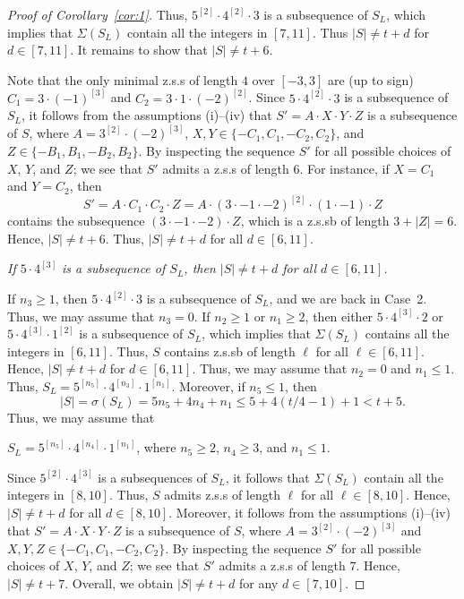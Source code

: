 \documentclass[12 pt]{amsart}
\def \n{\noindent }
\def \bs{\bigskip}
\def \zs{z.s.s }
\def \zsb{z.s.s{\tiny b} }
\begin{document}
\begin{proof}[Proof of Corollary~\ref{cor:1}]
Thus, $5^{[2]}\cdot 4^{[2]}\cdot 3$ is a subsequence of $S_L$, which implies that $\Sigma(S_L)$ contain all the integers in $[7,11]$. Thus $|S|\not=t+d$ for $d\in[7,11]$. It remains to 
show that $|S|\not=t+6$.

Note that the only minimal \zs of length $4$ over
$[-3,3]$ are (up to sign) $C_1=3\cdot(-1)^{[3]}$ and $C_2=3\cdot 1 \cdot(-2)^{[2]}$. Since $5\cdot 4^{[2]}\cdot 3$ is a subsequence of $S_L$, it follows from the assumptions (i)--(iv) that 
$S'=A\cdot X\cdot Y\cdot Z$ is a subsequence of $S$, where  $A=3^{[2]}\cdot(-2)^{[3]}$, $X,Y\in\{-C_1,C_1,-C_2,C_2\}$, 
and $Z\in\{-B_1,B_1,-B_2,B_2\}$. By inspecting the sequence $S'$ for all possible choices of $X$, $Y$, and $Z$; we see that $S'$ admits a \zs of length $6$. 
For instance, if $X=C_1$ and $Y=C_2$, then 
\[S'=A\cdot C_1\cdot C_2\cdot Z=A\cdot (3\cdot -1\cdot-2)^{[2]}\cdot (1\cdot-1)\cdot Z\]
contains the subsequence $(3\cdot -1\cdot-2)\cdot Z$, which is a \zsb of length $3+|Z|=6$. Hence, $|S|\not=t+6$.
Thus, $|S|\not=t+d$ for all $d\in[6,11]$.

\bs\n {\bf Claim~3:} {\em If $5\cdot 4^{[3]}$ is a subsequence of $S_L$, then  $|S|\not=t+d$ for all $d\in[6,11]$.}

If $n_3\geq 1$, then $5\cdot 4^{[2]}\cdot3$ is a subsequence of $S_L$, and we are back in Case~2. Thus, we may assume that $n_3=0$. If ${n_2}\geq1$ or ${n_1}\geq2$, then either  $5\cdot 4^{[3]}\cdot2$ or  $5\cdot 4^{[3]}\cdot1^{[2]}$ is a subsequence of $S_L$, which implies that $\Sigma(S_L)$ contains all the integers in $[6,11]$. Thus, $S$ contains \zsb of length $\ell$ for all $\ell\in[6,11]$. Hence, $|S|\not=t+d$ for $d\in[6,11]$. Thus, we may assume that $n_2=0$ and $n_1\leq 1$. Thus,  $S_L=5^{[n_5]}\cdot 4^{[n_3]}\cdot 1^{[n_1]}$. Moreover, if $n_5\leq1$, then 
\[|S|=\sigma(S_L)=5n_5+4n_4+{n_1}\leq 5+4(t/4-1)+1<t+5.\]
Thus, we may assume that 

\centerline{$S_L=5^{[n_5]}\cdot 4^{[n_4]}\cdot 1^{[n_1]}$, where $n_5\geq 2$, $n_4\geq 3$, and $n_1\leq 1$.}
Since $5^{[2]}\cdot 4^{[3]}$ is a subsequences of $S_L$, 
it follows that $\Sigma(S_L)$ contain all the integers in $[8,10]$.
Thus, $S$ admits \zs of length $\ell$ for all $\ell\in[8,10]$.
Hence, $|S|\not=t+d$ for all $d\in[8,10]$.
Moreover, it follows from the assumptions (i)--(iv) that 
$S'=A\cdot X\cdot Y\cdot Z$ is a subsequence of $S$, where  $A=3^{[2]}\cdot(-2)^{[3]}$ and $X,Y,Z\in\{-C_1,C_1,-C_2,C_2\}$.
By inspecting the sequence $S'$ for all possible choices 
of $X$, $Y$, and $Z$; we see that $S'$ admits a \zs of length $7$. Hence, $|S|\not=t+7$. Overall, we obtain $|S|\not=t+d$ for any $d\in[7,10]$.


\end{proof}
\end{document}
